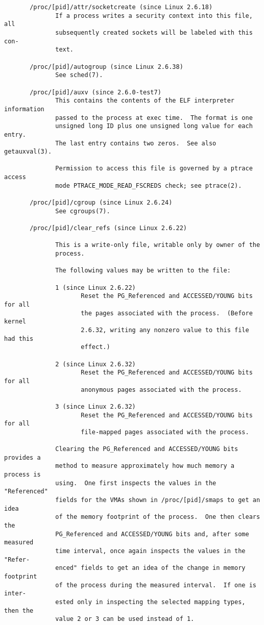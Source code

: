 \documentclass[]{article}
\begin{document}
\begin{verbatim}
       /proc/[pid]/attr/socketcreate (since Linux 2.6.18)
              If a process writes a security context into this file, all
              subsequently created sockets will be labeled with this con‐
              text.

       /proc/[pid]/autogroup (since Linux 2.6.38)
              See sched(7).

       /proc/[pid]/auxv (since 2.6.0-test7)
              This contains the contents of the ELF interpreter information
              passed to the process at exec time.  The format is one
              unsigned long ID plus one unsigned long value for each entry.
              The last entry contains two zeros.  See also getauxval(3).

              Permission to access this file is governed by a ptrace access
              mode PTRACE_MODE_READ_FSCREDS check; see ptrace(2).

       /proc/[pid]/cgroup (since Linux 2.6.24)
              See cgroups(7).

       /proc/[pid]/clear_refs (since Linux 2.6.22)

              This is a write-only file, writable only by owner of the
              process.

              The following values may be written to the file:

              1 (since Linux 2.6.22)
                     Reset the PG_Referenced and ACCESSED/YOUNG bits for all
                     the pages associated with the process.  (Before kernel
                     2.6.32, writing any nonzero value to this file had this
                     effect.)

              2 (since Linux 2.6.32)
                     Reset the PG_Referenced and ACCESSED/YOUNG bits for all
                     anonymous pages associated with the process.

              3 (since Linux 2.6.32)
                     Reset the PG_Referenced and ACCESSED/YOUNG bits for all
                     file-mapped pages associated with the process.

              Clearing the PG_Referenced and ACCESSED/YOUNG bits provides a
              method to measure approximately how much memory a process is
              using.  One first inspects the values in the "Referenced"
              fields for the VMAs shown in /proc/[pid]/smaps to get an idea
              of the memory footprint of the process.  One then clears the
              PG_Referenced and ACCESSED/YOUNG bits and, after some measured
              time interval, once again inspects the values in the "Refer‐
              enced" fields to get an idea of the change in memory footprint
              of the process during the measured interval.  If one is inter‐
              ested only in inspecting the selected mapping types, then the
              value 2 or 3 can be used instead of 1.


\end{verbatim}
\end{document}
